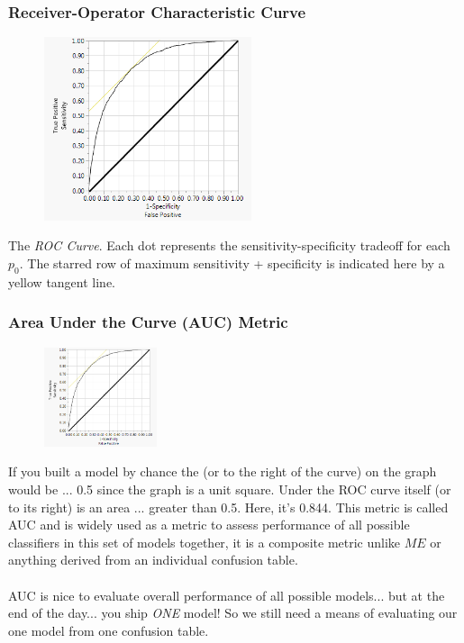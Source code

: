 \documentclass[handout]{beamer}
\begin{document}
\begin{frame}\frametitle{Receiver-Operator Characteristic Curve}

\vspace{-0.2cm}
\begin{figure}
\centering
\hspace{-0.5cm}\includegraphics[width=2.4in]{roc_curve.png}
\end{figure}

\small
\vspace{-0.3cm}
The \emph{ROC Curve}. Each dot represents the sensitivity-specificity tradeoff for each $p_0$. The starred row of maximum sensitivity + specificity is indicated here by a yellow tangent line. %

\end{frame}


\begin{frame}\frametitle{Area Under the Curve (AUC) Metric}

\vspace{-0.2cm}
\begin{figure}
\centering
\hspace{-0.5cm}\includegraphics[width=1.3in]{roc_curve.png}
\end{figure}

\small
\vspace{-0.3cm}
If you built a model by chance the  (or to the right of the curve) on the graph would be ...  0.5 since the graph is a unit square. Under the ROC curve itself (or to its right) is an area ...  greater than 0.5. Here, it's 0.844.  This metric is called AUC and is widely used as a metric to assess performance of all possible classifiers in this set of models together, it is a composite metric unlike $ME$ or anything derived from an individual confusion table.\\~\\ 

AUC is nice to evaluate overall performance of all possible models... but at the end of the day...  you ship \emph{ONE} model! So we still need a means of evaluating our one model from one confusion table.

\end{frame}
\end{document}
